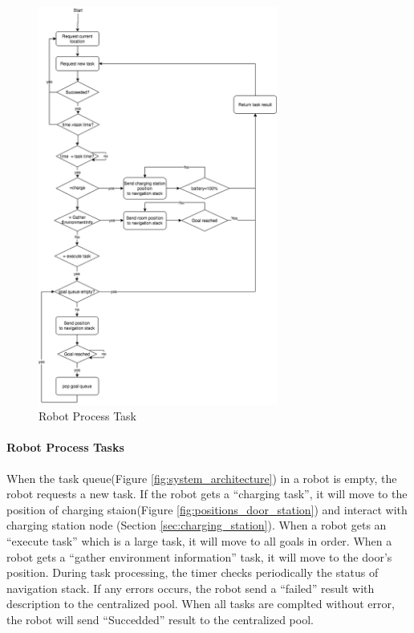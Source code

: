 \begin{figure}[htbp]
    \centering
    \includegraphics[width = 0.7\textwidth]{content/images/ch4/robot_process_task.drawio.png}
    \caption{Robot Process Task }
    \label{fig:task_process_robot}
\end{figure}

\paragraph{Robot Process Tasks}
When the task queue(Figure \ref{fig:system_architecture}) in a robot is empty, the robot requests a new task. If the robot gets a ``charging task'', it will move to the position of charging staion(Figure \ref{fig:positions_door_station}) and interact with charging station node (Section \ref{sec:charging_station}).
When a robot gets an ``execute task'' which is a large task, it will move to all goals in order.
When a robot gets a ``gather environment information'' task, it will move to the door's position.
During task processing, the timer checks periodically the status of navigation stack. If any errors occurs, the robot send a ``failed'' result with description to the centralized pool.  
When all tasks are complted without error, the robot will send ``Succedded'' result to the centralized pool.


